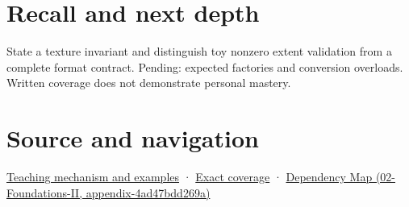 \section{Recall and next depth}\label{appendix-7f8ec83d0886-recall-and-next-depth}

State a texture invariant and distinguish toy nonzero extent validation from a complete format contract. Pending: expected factories and conversion overloads. Written coverage does not demonstrate personal mastery.

\section{Source and navigation}\label{appendix-7f8ec83d0886-source-and-navigation}

\href{Continuous\%20Notes/Computing\%20Foundations\%20-\%20From\%20Bits\%20to\%20C++\%20and\%20Systems\%20APIs\#Construction\%20establishes\%20a\%20usable\%20state}{Teaching mechanism and examples} · \hyperref[appendix-fd090d982a15-m009---parts-127-147]{Exact coverage} · \href{../02-Foundations-II/main.pdf\#nameddest=appendix-4ad47bdd269a}{Dependency Map (02-Foundations-II, appendix-4ad47bdd269a)}
